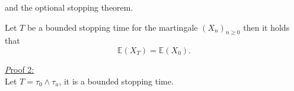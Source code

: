 \noindent and the optional stopping theorem.
\begin{theo}
Let $T$ be a bounded stopping time for the martingale $(X_n)_{n\geq0}$ then it holds that 
$$
\mathbb{E}(X_T) = \mathbb{E}(X_0) .
$$

\end{theo}
\underline{\textit Proof 2:}\\
Let $T = \tau_0\land\tau_a$, it is a bounded stopping time.\\

